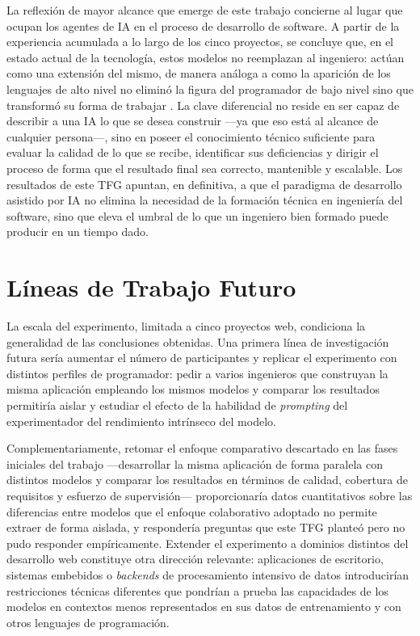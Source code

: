 La reflexión de mayor alcance que emerge de este trabajo concierne al lugar que ocupan los agentes de \ac{IA} en el proceso de desarrollo de software. A partir de la experiencia acumulada a lo largo de los cinco proyectos, se concluye que, en el estado actual de la tecnología, estos modelos no reemplazan al ingeniero: actúan como una extensión del mismo, de manera análoga a como la aparición de los lenguajes de alto nivel no eliminó la figura del programador de bajo nivel sino que transformó su forma de trabajar 
\cite{Welsh:2023:TEoP}. La clave diferencial no reside en ser capaz de describir a una \ac{IA} lo que se desea construir ---ya que eso está al alcance de cualquier persona---, sino en poseer el conocimiento técnico suficiente para evaluar la calidad de lo que se recibe, identificar sus deficiencias y dirigir el proceso de forma que el resultado final sea correcto, mantenible y escalable. Los resultados de este \ac{TFG} apuntan, en definitiva, a que el paradigma de desarrollo asistido por \ac{IA} no elimina la necesidad de la formación técnica en ingeniería del software, sino que eleva el umbral de lo que un ingeniero bien formado puede producir en un tiempo dado.

\section{Líneas de Trabajo Futuro} \label{sec:trabajo-futuro}

La escala del experimento, limitada a cinco proyectos web, condiciona la generalidad de las conclusiones obtenidas. Una primera línea de investigación futura sería aumentar el número de participantes y replicar el experimento con distintos perfiles de programador: pedir a varios ingenieros que construyan la misma aplicación empleando los mismos modelos y comparar los resultados permitiría aislar y estudiar el efecto de la habilidad de \textit{prompting} del experimentador del rendimiento intrínseco del modelo.

Complementariamente, retomar el enfoque comparativo descartado en las fases iniciales del trabajo ---desarrollar la misma aplicación de forma paralela con distintos modelos y comparar los resultados en términos de calidad, cobertura de requisitos y esfuerzo de supervisión--- proporcionaría datos cuantitativos sobre las diferencias entre modelos que el enfoque colaborativo adoptado no permite extraer de forma aislada, y respondería preguntas que este \ac{TFG} planteó pero no pudo responder empíricamente. Extender el experimento a dominios distintos del desarrollo web constituye otra dirección relevante: aplicaciones de escritorio, sistemas embebidos o \textit{backends} de procesamiento intensivo de datos introducirían restricciones técnicas diferentes que pondrían a prueba las capacidades de los modelos en contextos menos representados en sus datos de entrenamiento y con otros lenguajes de programación.

